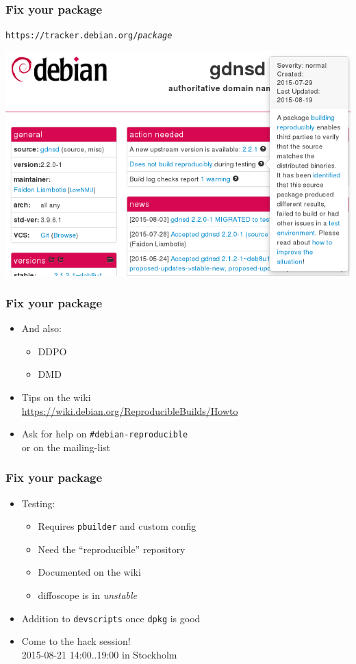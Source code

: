 \documentclass[14pt]{beamer}
\begin{document}
\begin{frame}
 \frametitle{Fix your package}

 \begin{center}
  \texttt{https://tracker.debian.org/\textit{package}}

  \includegraphics[width=0.8\linewidth]{images/tracker-gdnsd.png}
 \end{center}
\end{frame}

\begin{frame}
 \frametitle{Fix your package}

 \begin{itemize}
  \item And also:
   \begin{itemize}
    \item DDPO
    \item DMD
   \end{itemize}
  \item Tips on the wiki \\
   {\small \url{https://wiki.debian.org/ReproducibleBuilds/Howto}}
  \item Ask for help on \texttt{\#debian-reproducible} \\
   or on the mailing-list
 \end{itemize}
\end{frame}

\begin{frame}
 \frametitle{Fix your package}

 \begin{itemize}
  \item Testing:
   \begin{itemize}
    \item Requires \texttt{pbuilder} and custom config
    \item Need the “reproducible” repository
    \item Documented on the wiki
    \item diffoscope is in \textit{unstable}
   \end{itemize}
  \item Addition to \texttt{devscripts} once \texttt{dpkg} is good
  \item Come to the hack session! \\
    2015-08-21 14:00..19:00 in Stockholm
 \end{itemize}
\end{frame}
\end{document}
